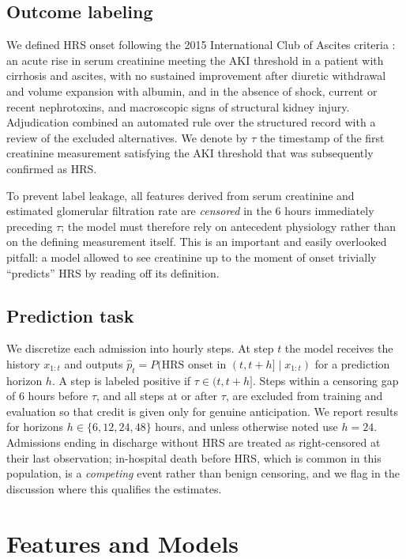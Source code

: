 \documentclass{article}
\begin{document}
\subsection{Outcome labeling}

We defined HRS onset following the 2015 International Club of Ascites criteria
\citep{Angeli2015}: an acute rise in serum creatinine meeting the AKI threshold in
a patient with cirrhosis and ascites, with no sustained improvement after diuretic
withdrawal and volume expansion with albumin, and in the absence of shock,
current or recent nephrotoxins, and macroscopic signs of structural kidney injury.
Adjudication combined an automated rule over the structured record with a review of
the excluded alternatives. We denote by $\tau$ the timestamp of the first
creatinine measurement satisfying the AKI threshold that was subsequently confirmed
as HRS.

To prevent label leakage, all features derived from serum creatinine and estimated
glomerular filtration rate are \emph{censored} in the $6$ hours immediately
preceding $\tau$; the model must therefore rely on antecedent physiology rather
than on the defining measurement itself. This is an important and easily
overlooked pitfall: a model allowed to see creatinine up to the moment of onset
trivially ``predicts'' HRS by reading off its definition.

\subsection{Prediction task}
\label{sec:task}

We discretize each admission into hourly steps. At step $t$ the model receives the
history $x_{1:t}$ and outputs $\hat{p}_t = P(\text{HRS onset in } (t, t+h] \mid
x_{1:t})$ for a prediction horizon $h$. A step is labeled positive if $\tau \in
(t, t+h]$. Steps within a censoring gap of $6$ hours before $\tau$, and all steps
at or after $\tau$, are excluded from training and evaluation so that credit is
given only for genuine anticipation. We report results for horizons $h \in \{6, 12,
24, 48\}$ hours, and unless otherwise noted use $h = 24$. Admissions ending in
discharge without HRS are treated as right-censored at their last observation;
in-hospital death before HRS, which is common in this population, is a \emph{competing}
event rather than benign censoring, and we flag in the discussion where this qualifies
the estimates.

\section{Features and Models}
\end{document}
